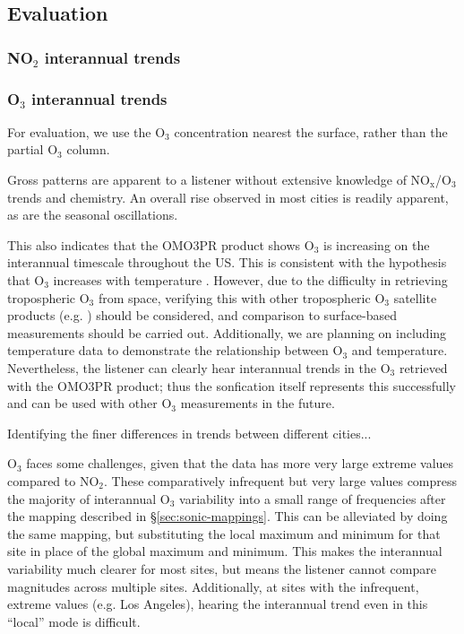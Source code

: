 \documentclass[a4paper,10pt,oneside]{article}
\newcommand{\ce}[1]{$\mathrm{#1}$}
\begin{document}
\begin{sloppy}
\subsection{Evaluation}


\subsubsection{NO$_2$ interannual trends}

\subsubsection{O$_3$ interannual trends}
For evaluation, we use the \ce{O_3} concentration nearest the surface, rather than the partial \ce{O_3} column.

Gross patterns are apparent to a listener without extensive knowledge of \ce{NO_x}/\ce{O_3} trends and chemistry.  An overall rise observed in most cities is readily apparent, as are the seasonal oscillations. 

This also indicates that the OMO3PR product shows \ce{O_3} is increasing on the interannual timescale throughout the US. This is consistent with the hypothesis that \ce{O_3} increases with temperature \cite{lin17}. However, due to the difficulty in retrieving tropospheric \ce{O_3} from space, verifying this with other tropospheric \ce{O_3} satellite products (e.g. \cite{choi08}) should be considered, and comparison to surface-based measurements should be carried out. Additionally, we are planning on including temperature data to demonstrate the relationship between \ce{O_3} and temperature.  Nevertheless, the listener can clearly hear interannual trends in the \ce{O_3} retrieved with the OMO3PR product; thus the sonfication itself represents this successfully and can be used with other \ce{O_3} measurements in the future.

Identifying the finer differences in trends between different cities...

\ce{O_3} faces some challenges, given that the data has more very large extreme values compared to \ce{NO_2}. These comparatively infrequent but very large values compress the majority of interannual \ce{O_3} variability into a small range of frequencies after the mapping described in \S\ref{sec:sonic-mappings}.  This can be alleviated by doing the same mapping, but substituting the local maximum and minimum for that site in place of the global maximum and minimum. This makes the interannual variability much clearer for most sites, but means the listener cannot compare magnitudes across multiple sites. Additionally, at sites with the infrequent, extreme values (e.g. Los Angeles), hearing the interannual trend even in this ``local'' mode is difficult.


\end{sloppy}
\end{document}
